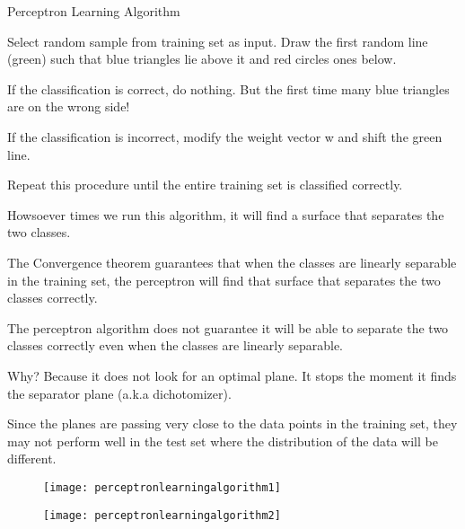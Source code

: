 Perceptron Learning Algorithm
	\begin{numberedlist}
		\item Select random sample from training set as input. Draw the first random line (green) such that blue triangles lie above it and red circles ones below.
		\item If the classification is correct, do nothing. But the first time many blue triangles are on the wrong side!
		\item If the classification is incorrect, modify the weight vector w and shift the green line.
		\item Repeat this procedure until the entire training set is classified correctly.
		\item Howsoever times we run this algorithm, it will find a surface that separates the two classes.
		\item The Convergence theorem guarantees that when the classes are linearly separable in the training set, the perceptron will find that surface that separates the two classes correctly.
		\item The perceptron algorithm does not guarantee it will be able to separate the two classes correctly even when the classes are linearly separable.
		\item Why? Because it does not look for an optimal plane. It stops the moment it finds the separator plane (a.k.a dichotomizer).
		\item Since the planes are passing very close to the data points in the training set, they may not perform well in the test set where the distribution of the data will be different.
	\end{numberedlist}

 	\begin{figure}[h]
		\centering
		\texttt{[image: perceptronlearningalgorithm1]}
		\caption{}
		\label{fig:perceptronlearningalgorithm1}
	\end{figure}
 	\begin{figure}[h]
		\centering
		\texttt{[image: perceptronlearningalgorithm2]}
		\caption{}
		\label{fig:perceptronlearningalgorithm2}
	\end{figure}

